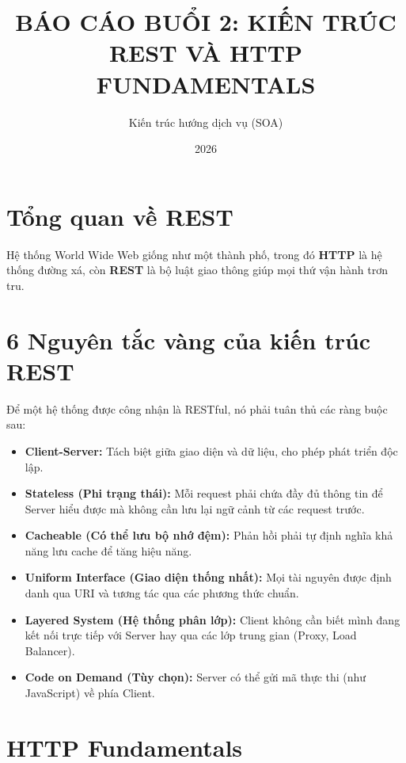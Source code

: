 \documentclass[12pt]{article}
\title{\textbf{BÁO CÁO BUỔI 2: KIẾN TRÚC REST VÀ HTTP FUNDAMENTALS}}
\author{Kiến trúc hướng dịch vụ (SOA)}
\date{2026}
\begin{document}
\maketitle

\section{Tổng quan về REST}
Hệ thống World Wide Web giống như một thành phố, trong đó \textbf{HTTP} là hệ thống đường xá, còn \textbf{REST} là bộ luật giao thông giúp mọi thứ vận hành trơn tru.

\section{6 Nguyên tắc vàng của kiến trúc REST}
Để một hệ thống được công nhận là RESTful, nó phải tuân thủ các ràng buộc sau:

\begin{itemize}
    \item \textbf{Client-Server:} Tách biệt giữa giao diện và dữ liệu, cho phép phát triển độc lập.
    \item \textbf{Stateless (Phi trạng thái):} Mỗi request phải chứa đầy đủ thông tin để Server hiểu được mà không cần lưu lại ngữ cảnh từ các request trước.
    \item \textbf{Cacheable (Có thể lưu bộ nhớ đệm):} Phản hồi phải tự định nghĩa khả năng lưu cache để tăng hiệu năng.
    \item \textbf{Uniform Interface (Giao diện thống nhất):} Mọi tài nguyên được định danh qua URI và tương tác qua các phương thức chuẩn.
    \item \textbf{Layered System (Hệ thống phân lớp):} Client không cần biết mình đang kết nối trực tiếp với Server hay qua các lớp trung gian (Proxy, Load Balancer).
    \item \textbf{Code on Demand (Tùy chọn):} Server có thể gửi mã thực thi (như JavaScript) về phía Client.
\end{itemize}

\section{HTTP Fundamentals}
\end{document}

